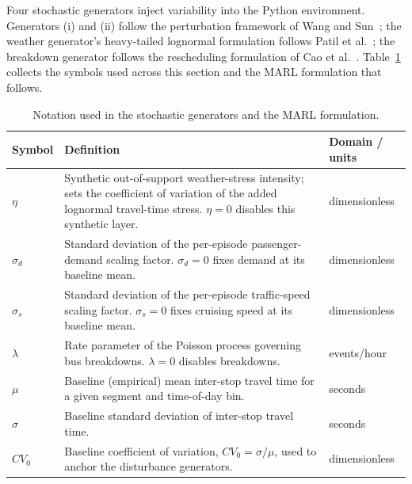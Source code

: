 Four stochastic generators inject variability into the Python environment. Generators (i) and (ii) follow the perturbation framework of Wang and Sun~\cite{Wangsun}; the weather generator's heavy-tailed lognormal formulation follows Patil et al.~\cite{Patil2025Conformal}; the breakdown generator follows the rescheduling formulation of Cao et al.~\cite{Cao2022Train}. Table~\ref{tab:notation} collects the symbols used across this section and the MARL formulation that follows.


\begin{table}[htbp]
\centering
\caption{Notation used in the stochastic generators and the MARL formulation.}
\label{tab:notation}

\small
\renewcommand{\arraystretch}{1.25}

\begin{tabularx}{\textwidth}{
>{\RaggedRight\arraybackslash}p{}
>{\RaggedRight\arraybackslash}X
>{\RaggedRight\arraybackslash}p{}
}

\toprule
\textbf{Symbol} & \textbf{Definition} & \textbf{Domain / units} \\
\midrule

$\eta$ &
Synthetic out-of-support weather-stress intensity; sets the coefficient of variation of the added lognormal travel-time stress. $\eta=0$ disables this synthetic layer. &
dimensionless \\

$\sigma_d$ &
Standard deviation of the per-episode passenger-demand scaling factor. $\sigma_d=0$ fixes demand at its baseline mean. &
dimensionless \\

$\sigma_s$ &
Standard deviation of the per-episode traffic-speed scaling factor. $\sigma_s=0$ fixes cruising speed at its baseline mean. &
dimensionless \\

$\lambda$ &
Rate parameter of the Poisson process governing bus breakdowns. $\lambda=0$ disables breakdowns. &
events/hour \\

$\mu$ &
Baseline (empirical) mean inter-stop travel time for a given segment and time-of-day bin. &
seconds \\

$\sigma$ &
Baseline standard deviation of inter-stop travel time. &
seconds \\

$CV_0$ &
Baseline coefficient of variation, $CV_0=\sigma/\mu$, used to anchor the disturbance generators. &
dimensionless \\


\end{tabularx}
\end{table}
